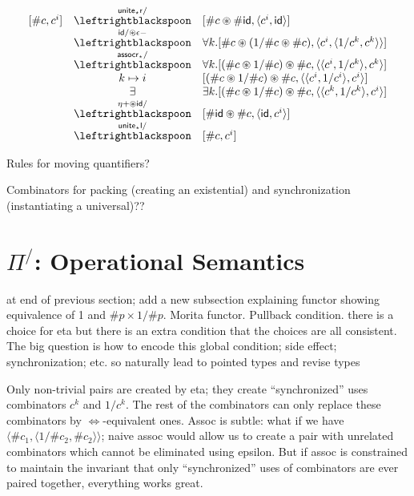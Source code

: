 \documentclass[a4paper,USenglish]{lipics-v2016-utf8x}
\newcommand{\hash}{\#}
\newcommand{\isotwo}{\Leftrightarrow}
\newcommand{\order}[1]{\hash #1}
\newcommand{\iorder}[1]{1/\hash #1}
\newcommand{\unitetl}{\mathsf{{unite_{\star}l}}}
\newcommand{\unitetr}{\mathsf{{unite_{\star}r}}}
\newcommand{\assocrt}{\mathsf{{assocr_{\star}}}}
\newcommand{\idiso}{\mathsf{{id}}}
\begin{document}
\[\begin{array}{rcl}
  [\order{c}, c^i]
&\stackrel{\unitetr/}{\leftrightblackspoon}&
  [\order{c}\circledast\order{\idiso},
  \langle c^i, \idiso \rangle] \\
&\stackrel{\idiso/\circledast\epsilon-}{\leftrightblackspoon}&
  \forall{k}.[\order{c}\circledast(\iorder{c}\circledast\order{c}),
  \langle c^i, \langle 1/c^k,c^k \rangle\rangle] \\
&\stackrel{\assocrt/}{\leftrightblackspoon}&
  \forall{k}.[(\order{c}\circledast\iorder{c})\circledast\order{c},
  \langle \langle c^i,1/c^k \rangle,c^k \rangle] \\
&k\mapsto i&
  [(\order{c}\circledast\iorder{c})\circledast\order{c},
  \langle \langle c^i,1/c^i \rangle,c^i \rangle] \\
&\exists&
  \exists{k}.[(\order{c}\circledast\iorder{c})\circledast\order{c},
  \langle \langle c^k,1/c^k \rangle,c^i \rangle] \\
&\stackrel{\eta+\circledast\idiso/}{\leftrightblackspoon}&
  [\order{\idiso}\circledast\order{c}, \langle \idiso,c^i\rangle] \\
&\stackrel{\unitetl/}{\leftrightblackspoon}&
  [\order{c},c^i]
\end{array}\]

Rules for moving quantifiers?

Combinators for packing (creating an existential) and synchronization
(instantiating a universal)??

\section{$\Pi^/$: Operational Semantics}

at end of previous section; add a new subsection explaining functor showing
equivalence of 1 and $\order{p} \times \iorder{p}$. Morita functor. Pullback condition. there is a
choice for eta but there is an extra condition that the choices are all
consistent. The big question is how to encode this global condition; side
effect; synchronization; etc. so naturally lead to pointed types and revise types

Only non-trivial pairs are created by eta; they create ``synchronized'' uses combinators $c^k$ and $1/c^k$. The rest of the combinators can only replace these combinators by $\isotwo$-equivalent ones. Assoc is subtle: what if we have $\langle \order{c_1} , \langle \iorder{c_2} , \order{c_2} \rangle \rangle$; naive assoc would allow us to create a pair with unrelated combinators which cannot be eliminated using epsilon. But if assoc is constrained to maintain the invariant that only ``synchronized'' uses of combinators are ever paired together, everything works great.
\end{document}
